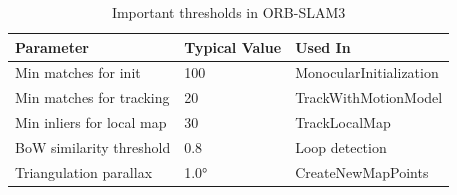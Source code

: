 \begin{table}[H]
\centering
\begin{tabular}{@{}lll@{}}
\toprule
\textbf{Parameter} & \textbf{Typical Value} & \textbf{Used In} \\
\midrule
Min matches for init & 100 & MonocularInitialization \\
Min matches for tracking & 20 & TrackWithMotionModel \\
Min inliers for local map & 30 & TrackLocalMap \\
BoW similarity threshold & 0.8 & Loop detection \\
Triangulation parallax & 1.0° & CreateNewMapPoints \\
\bottomrule
\end{tabular}
\caption{Important thresholds in ORB-SLAM3}
\end{table}
